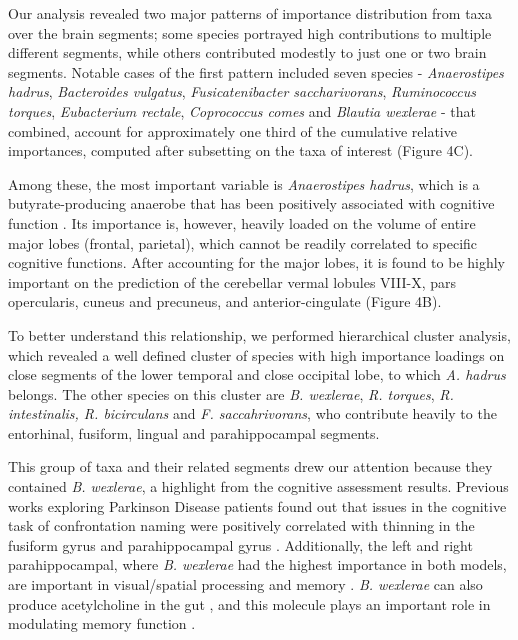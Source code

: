 \documentclass[a4paper]{article}
\begin{document}
Our analysis revealed two major patterns of importance distribution from
taxa over the brain segments; some species portrayed high contributions
to multiple different segments, while others contributed modestly to
just one or two brain segments. Notable cases of the first pattern
included seven species - \emph{Anaerostipes hadrus}, \emph{Bacteroides
vulgatus}, \emph{Fusicatenibacter saccharivorans}, \emph{Ruminococcus
torques}, \emph{Eubacterium rectale}, \emph{Coprococcus comes} and
\emph{Blautia wexlerae} - that combined, account for approximately one
third of the cumulative relative importances, computed after subsetting
on the taxa of interest (Figure 4C).

Among these, the most important variable is \emph{Anaerostipes hadrus},
which is a butyrate-producing anaerobe that has been positively
associated with cognitive function
\citep{kantGenomeSequenceButyrateProducing2015,liCorrelationsGutMicrobiota2022}.
Its importance is, however, heavily loaded on the volume
of entire major lobes (frontal, parietal), which cannot be readily
correlated to specific cognitive functions. After accounting for the
major lobes, it is found to be highly important on the prediction of the
cerebellar vermal lobules VIII-X, pars opercularis, cuneus and
precuneus, and anterior-cingulate (Figure 4B).

To better understand this relationship, we performed hierarchical
cluster analysis, which revealed a well defined cluster of species with
high importance loadings on close segments of the lower temporal and
close occipital lobe, to which \emph{A. hadrus} belongs. The other
species on this cluster are \emph{B. wexlerae}, \emph{R. torques},
\emph{R. intestinalis, R. bicirculans} and \emph{F. saccahrivorans}, who
contribute heavily to the entorhinal, fusiform, lingual and
parahippocampal segments.

This group of taxa and their related segments drew our attention because
they contained \emph{B. wexlerae}, a highlight from the cognitive
assessment results. Previous works exploring Parkinson Disease patients
found out that issues in the cognitive task of confrontation naming were
positively correlated with thinning in the fusiform gyrus and
parahippocampal gyrus
\citep{pagonabarragaPatternRegionalCortical2013}.
Additionally, the left and right parahippocampal, where \emph{B.
wexlerae} had the highest importance in both models, are important in
visual/spatial processing and memory
\citep{aminoffRoleParahippocampalCortex2013}.
\emph{B. wexlerae} can also produce acetylcholine in the gut
\citep{hosomiOralAdministrationBlautia2022},
and this molecule plays an important role in modulating memory
function
\citep{haamCholinergicModulationHippocampal2017}.
\end{document}
